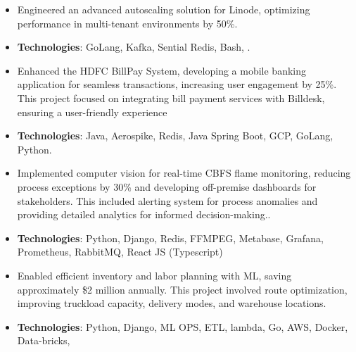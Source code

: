 
  

\begin{itemize}
\item Engineered an advanced autoscaling solution for Linode, optimizing performance in multi-tenant environments by 50\%.
\item \textbf{Technologies}: GoLang, Kafka, Sential Redis, Bash, .\\
\end{itemize}
\smallskip
\smallskip

\begin{itemize}
\item Enhanced the HDFC BillPay System, developing a mobile banking application for seamless transactions, increasing user engagement by 25\%. This project focused on integrating bill payment services with Billdesk, ensuring a user-friendly experience
\item \textbf{Technologies}: Java, Aerospike, Redis, Java Spring Boot, GCP, GoLang, Python.\\
\end{itemize}
\smallskip
\smallskip

\begin{itemize}
\item Implemented computer vision for real-time CBFS flame monitoring, reducing process exceptions by 30\% and developing off-premise dashboards for stakeholders. This included alerting system for process anomalies and providing detailed analytics for informed decision-making..
\item \textbf{Technologies}: Python, Django, Redis, FFMPEG, Metabase, Grafana, Prometheus, Rabbit\hspace{2mm}MQ, React JS (Typescript)\\
\end{itemize}
\smallskip
\smallskip

\begin{itemize}
\item Enabled efficient inventory and labor planning with ML, saving approximately \$2 million annually. This project involved route optimization, improving truckload capacity, delivery modes, and warehouse locations.
\item \textbf{Technologies}: Python, Django, ML OPS, ETL, lambda, Go, AWS, Docker, Data-bricks,  \\
\end{itemize}
\smallskip
\smallskip


